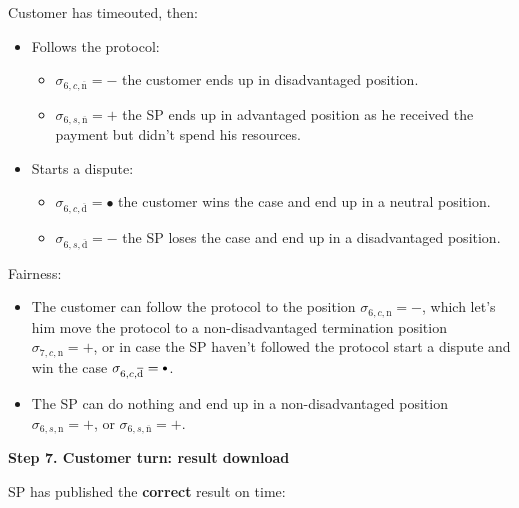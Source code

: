 \documentclass{ieeeaccess}
\newcommand\sbullet[1][.75]{\mathbin{\ThisStyle{\vcenter{\hbox{%
  \scalebox{#1}{$\SavedStyle\bullet$}}}}}%
}
\begin{document}
Customer has timeouted, then:

\begin{itemize}
\item
  Follows the protocol:

  \begin{itemize}
  
  \item
    \(\sigma_{6, c, \overline{\mathrm{n}}} = -\) the customer ends up in
    disadvantaged position.
  \item
    \(\sigma_{6, s, \overline{\mathrm{n}}} = +\) the SP ends up in
    advantaged position as he received the payment but didn't spend his
    resources.
  \end{itemize}
\item
  Starts a dispute:

  \begin{itemize}
  
  \item
    \(\sigma_{6, c, \overline{\mathrm{d}}} = •\) the customer wins the
    case and end up in a neutral position.
  \item
    \(\sigma_{6, s, \overline{\mathrm{d}}} = -\) the SP loses the case
    and end up in a disadvantaged position.
  \end{itemize}
\end{itemize}

Fairness:

\begin{itemize}

\item
  The customer can follow the protocol to the position
  \(\sigma_{6, c, \mathrm{n}} = -\), which let's him move the protocol
  to a non-disadvantaged termination position
  \(\sigma_{7, c, \mathrm{n}} = +\), or in case the SP haven't followed
  the protocol start a dispute and win the case
  \(\sigma_{6, c, \overline{\mathrm{d}}} = \sbullet\).
\item
  The SP can do nothing and end up in a non-disadvantaged position
  \(\sigma_{6, s, \mathrm{n}} = +\), or
  \(\sigma_{6, s, \overline{\mathrm{n}}} = +\).
\end{itemize}

\noindent \textbf
{Step 7. Customer turn: result download}\label{step-7-retrieval-of-results}

SP has published the \textbf{correct} result on time:
\end{document}
